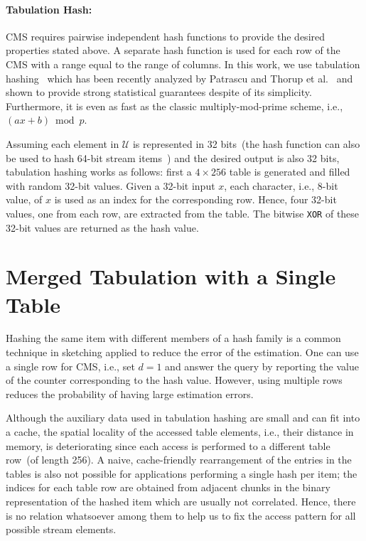 \documentclass[runningheads]{llncs}
\begin{document}
\paragraph{Tabulation Hash:} CMS requires pairwise independent hash functions to provide the desired properties stated above. A separate hash function is used for each row of the CMS with a range equal 
to the range of columns. In this work, we use tabulation hashing~\cite{zobrist1970} which has been recently analyzed by Patrascu and Thorup et al.~\cite{patrascu2012,thorup2017} and shown to provide  strong  statistical guarantees despite of its simplicity. Furthermore, it is even as fast as the classic multiply-mod-prime scheme, i.e., $(ax + b) \bmod p$. 

Assuming each element in $\mathcal{U}$ is represented in 32 bits~(the hash function can also be used to hash 64-bit stream items~\cite{thorup2017}) and the desired output is also 32 bits, tabulation hashing works as follows: first a $4 \times 256$ table is generated and filled with random 32-bit values. Given a 32-bit input $x$, each character, i.e., 8-bit value, of $x$ is used as an index for the corresponding row. Hence, four 32-bit values, one from each row, are extracted from the table. The bitwise {\tt XOR} of these 32-bit values are returned as the hash value. 

\section{Merged Tabulation with a Single Table}\label{sec:tab}
Hashing the same item with different members of a hash family is a common technique in sketching applied to reduce the error of the estimation. One can use a single row for CMS, i.e., set $d = 1$ and answer the query by reporting the value of the counter corresponding to the hash value. However, using multiple rows reduces the probability of having large estimation errors. 

Although the auxiliary data used in tabulation hashing are small and can fit into a cache, the spatial locality of the accessed table elements, i.e., their distance in memory, is deteriorating since each access is performed to a different table row~(of length 256). A naive, cache-friendly rearrangement of the entries in the tables is also not possible for applications performing a single hash per item; the indices for each table row are obtained from adjacent chunks in the binary representation of the hashed item which are usually not correlated. Hence, there is no relation whatsoever among them to help us to fix the access pattern for all possible stream elements.
\end{document}
